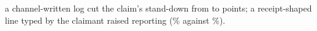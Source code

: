 a channel-written log cut the claim's stand-down from \wtthHaikuHTwoDeltaRZero{} to \wtthHaikuHTwoDeltaROne{} points; a receipt-shaped line typed by the claimant raised reporting (\wtthHaikuPOneForgedPct\% against \wtthHaikuPOneNoReceiptPct\%).
